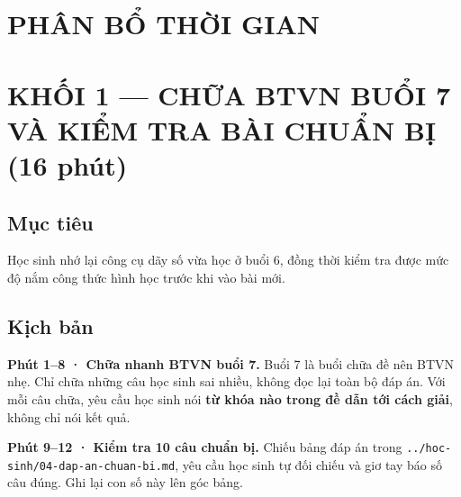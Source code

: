 \documentclass[11pt, a4paper]{article}
\begin{document}

\section{PHÂN BỔ THỜI GIAN}


\section{KHỐI 1 — CHỮA BTVN BUỔI 7 VÀ KIỂM TRA BÀI CHUẨN BỊ (16 phút)}

\subsection{Mục tiêu}

Học sinh nhớ lại công cụ dãy số vừa học ở buổi 6, đồng thời kiểm tra được mức độ nắm công thức hình học trước khi vào bài mới.

\subsection{Kịch bản}

\textbf{Phút 1–8 · Chữa nhanh BTVN buổi 7.} Buổi 7 là buổi chữa đề nên BTVN nhẹ. Chỉ chữa những câu học sinh sai nhiều, không đọc lại toàn bộ đáp án. Với mỗi câu chữa, yêu cầu học sinh nói \textbf{từ khóa nào trong đề dẫn tới cách giải}, không chỉ nói kết quả.

\textbf{Phút 9–12 · Kiểm tra 10 câu chuẩn bị.} Chiếu bảng đáp án trong \texttt{../hoc-sinh/04-dap-an-chuan-bi.md}, yêu cầu học sinh tự đối chiếu và giơ tay báo số câu đúng. Ghi lại con số này lên góc bảng.
\end{document}

